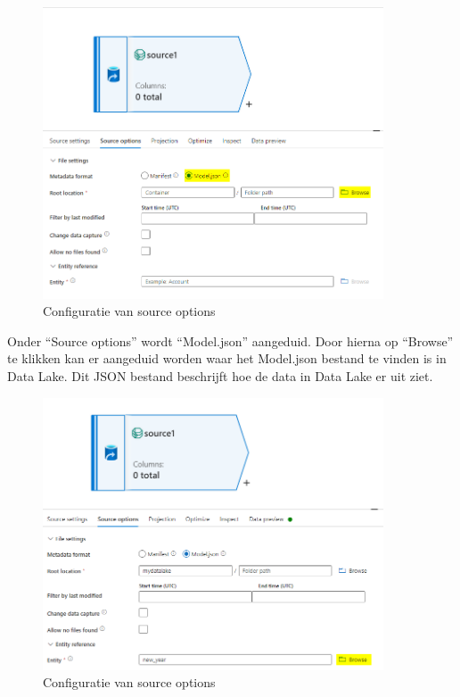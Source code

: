 \begin{figure}[H]
    \centering
    \includegraphics[width=0.9\textwidth]{./graphics/adf/source_table_4_specific.png}
    \caption{Configuratie van source options}
\end{figure}

Onder ``Source options'' wordt ``Model.json'' aangeduid. Door hierna op ``Browse'' te klikken kan er aangeduid worden waar het Model.json bestand te vinden is in Data Lake. Dit JSON bestand beschrijft hoe de data in Data Lake er uit ziet.

\begin{figure}[H]
    \centering
    \includegraphics[width=0.9\textwidth]{./graphics/adf/source_table_5_specific.png}
    \caption{Configuratie van source options}
\end{figure}

